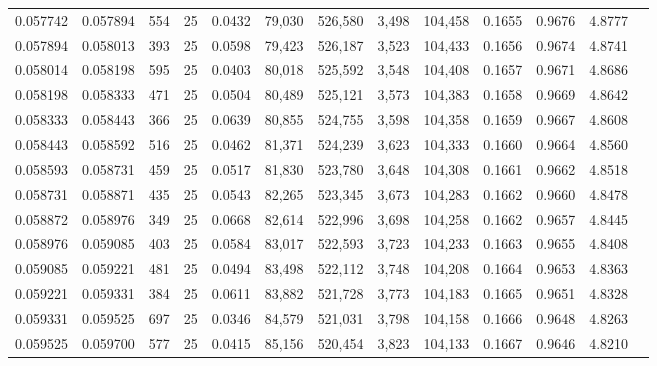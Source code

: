 \begin{tabular}{rrrrrrrrrrrrr}
0.057742 & 0.057894 &   554 &  25 &                                     0.0432 &  79,030 & 526,580 &   3,498 & 104,458 & 0.1655 & 0.9676 & 4.8777 \\
0.057894 & 0.058013 &   393 &  25 &                                     0.0598 &  79,423 & 526,187 &   3,523 & 104,433 & 0.1656 & 0.9674 & 4.8741 \\
0.058014 & 0.058198 &   595 &  25 &                                     0.0403 &  80,018 & 525,592 &   3,548 & 104,408 & 0.1657 & 0.9671 & 4.8686 \\
0.058198 & 0.058333 &   471 &  25 &                                     0.0504 &  80,489 & 525,121 &   3,573 & 104,383 & 0.1658 & 0.9669 & 4.8642 \\
0.058333 & 0.058443 &   366 &  25 &                                     0.0639 &  80,855 & 524,755 &   3,598 & 104,358 & 0.1659 & 0.9667 & 4.8608 \\
0.058443 & 0.058592 &   516 &  25 &                                     0.0462 &  81,371 & 524,239 &   3,623 & 104,333 & 0.1660 & 0.9664 & 4.8560 \\
0.058593 & 0.058731 &   459 &  25 &                                     0.0517 &  81,830 & 523,780 &   3,648 & 104,308 & 0.1661 & 0.9662 & 4.8518 \\
0.058731 & 0.058871 &   435 &  25 &                                     0.0543 &  82,265 & 523,345 &   3,673 & 104,283 & 0.1662 & 0.9660 & 4.8478 \\
0.058872 & 0.058976 &   349 &  25 &                                     0.0668 &  82,614 & 522,996 &   3,698 & 104,258 & 0.1662 & 0.9657 & 4.8445 \\
0.058976 & 0.059085 &   403 &  25 &                                     0.0584 &  83,017 & 522,593 &   3,723 & 104,233 & 0.1663 & 0.9655 & 4.8408 \\
0.059085 & 0.059221 &   481 &  25 &                                     0.0494 &  83,498 & 522,112 &   3,748 & 104,208 & 0.1664 & 0.9653 & 4.8363 \\
0.059221 & 0.059331 &   384 &  25 &                                     0.0611 &  83,882 & 521,728 &   3,773 & 104,183 & 0.1665 & 0.9651 & 4.8328 \\
0.059331 & 0.059525 &   697 &  25 &                                     0.0346 &  84,579 & 521,031 &   3,798 & 104,158 & 0.1666 & 0.9648 & 4.8263 \\
0.059525 & 0.059700 &   577 &  25 &                                     0.0415 &  85,156 & 520,454 &   3,823 & 104,133 & 0.1667 & 0.9646 & 4.8210 \\

\end{tabular}
